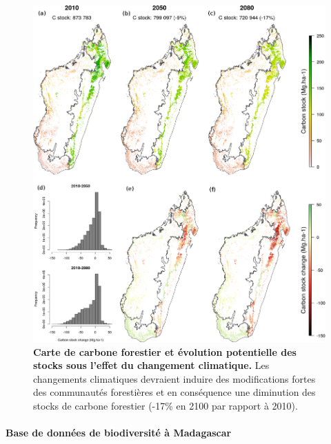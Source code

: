\documentclass[12pt,]{article}
\let\oldparagraph\paragraph
\renewcommand{\paragraph}[1]{\oldparagraph{#1}\mbox{}}
\begin{document}
\begin{figure}[H]

{\centering \includegraphics[width=\textwidth]{figures/carbonmaps} 

}

\caption{\textbf{Carte de carbone forestier et évolution
potentielle des stocks sous l'effet du changement climatique.} Les
changements climatiques devraient induire des modifications fortes des
communautés forestières et en conséquence une diminution des stocks de
carbone forestier (-17\% en 2100 par rapport à 2010).}\label{fig:carbonmaps}
\end{figure}

\hypertarget{base-de-donnees-de-biodiversite-a-madagascar-1}{%
\paragraph{Base de données de biodiversité à
Madagascar}\label{base-de-donnees-de-biodiversite-a-madagascar-1}}
\end{document}
